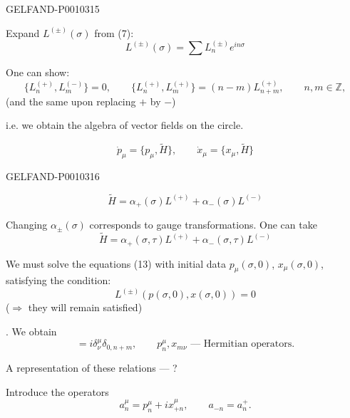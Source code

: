 \begin{GelfandAdjacentEvidence}{GELFAND-P001031}{5}


Expand $L^{(\pm)}(\sigma)$ from (7):
\begin{equation*}
L^{(\pm)}(\sigma)=\sum L_n^{(\pm)}e^{in\sigma}
\tag{11}
\end{equation*}

One can show:
\begin{equation*}
\{L_n^{(+)},L_m^{(-)}\}=0,\qquad
\{L_n^{(+)},L_m^{(+)}\}=(n-m)L_{n+m}^{(+)},\qquad n,m\in\mathbb Z,
\tag{12}
\end{equation*}
(and the same upon replacing $+$ by $-$)

i.e. we obtain the algebra of vector fields on the circle.

\begin{equation*}
\dot{p}_\mu=\{p_\mu,\widetilde H\},\qquad
\dot{x}_\mu=\{x_\mu,\widetilde H\}
\tag{13}
\end{equation*}
\end{GelfandAdjacentEvidence}
\begin{GelfandAdjacentEvidence}{GELFAND-P001031}{6}


\begin{equation*}
\widetilde H=\alpha_+(\sigma)L^{(+)}+\alpha_-(\sigma)L^{(-)}
\tag{14}
\end{equation*}

Changing $\alpha_\pm(\sigma)$ corresponds to gauge transformations. One can take
\begin{equation*}
\widetilde H=\alpha_+(\sigma,\tau)L^{(+)}+\alpha_-(\sigma,\tau)L^{(-)}
\tag{14'}
\end{equation*}

We must solve the equations (13) with initial data $p_\mu(\sigma,0)$, $x_\mu(\sigma,0)$,
satisfying the condition:
\begin{equation*}
L^{(\pm)}(p(\sigma,0),x(\sigma,0))=0
\tag{15}
\end{equation*}
($\Rightarrow$ they will remain satisfied)

. We obtain
\begin{equation*}
[p^\mu_n,x_{m\nu}]=i\delta^\mu_\nu\delta_{0,n+m},\qquad
p^\mu_n,x_{m\nu}\text{ --- Hermitian operators}.
\tag{16}
\end{equation*}

A representation of these relations --- ?

Introduce the operators
\begin{equation*}
a_n^\mu=p_n^\mu+i x_{+n}^\mu,\qquad a_{-n}=a_n^+.
\tag{17}
\end{equation*}
\end{GelfandAdjacentEvidence}
